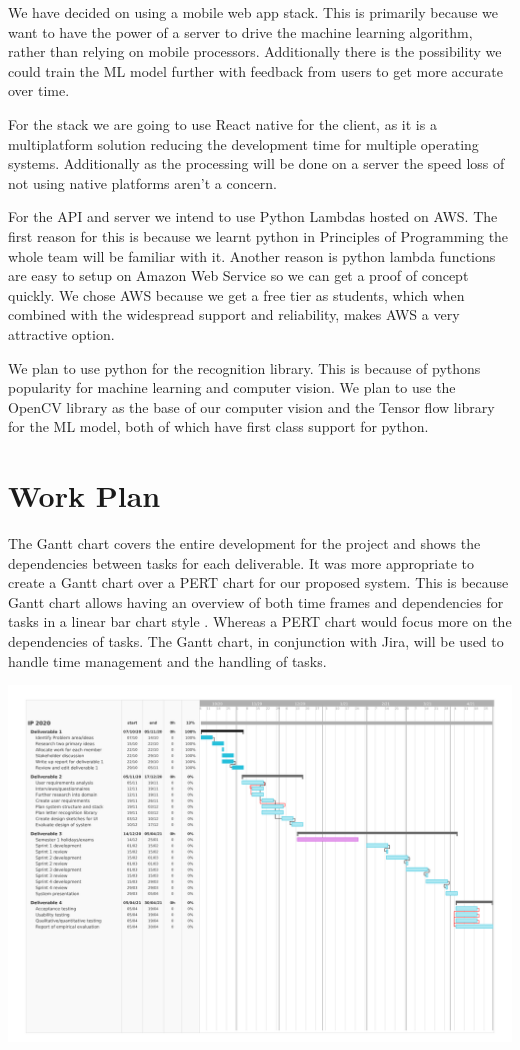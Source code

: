 \documentclass[10pt]{article}
\begin{document}
We have decided on using a mobile web app stack. This is primarily because we want to have the 
power of a server to drive the machine learning algorithm, rather than relying on mobile 
processors. Additionally there is the possibility we could train the ML model further with 
feedback from users to get more accurate over time.

For the stack we are going to use React native for the client, as it is a multiplatform solution 
reducing the development time for multiple operating systems. Additionally as the processing will 
be done on a server the speed loss of not using native platforms aren't a concern.

For the API and server we intend to use Python Lambdas hosted on AWS. The first reason for this is 
because we learnt python in Principles of Programming the whole team will be familiar with it. 
Another reason is python lambda functions are easy to setup on Amazon Web Service so we can get a 
proof of concept quickly. We chose AWS because we get a free tier as students, which when combined 
with the widespread support and reliability, makes AWS a very attractive option.

We plan to use python for the recognition library. This is because of pythons popularity for 
machine learning and computer vision. We plan to use the OpenCV library as the base of our 
computer vision and the Tensor flow library for the ML model, both of which have first class 
support for python.

\section{Work Plan}

The Gantt chart covers the entire development for the project and shows the dependencies between 
tasks for each deliverable. It was more appropriate to create a Gantt chart over a PERT chart for 
our proposed system. This is because Gantt chart allows having an overview of both time frames and 
dependencies for tasks in a linear bar chart style . Whereas a PERT chart would focus more on the 
dependencies of tasks. The Gantt chart, in conjunction with Jira, will be used to handle time 
management and the handling of tasks.

\includegraphics[width=\textwidth]{IpGantt.png}



\end{document}
